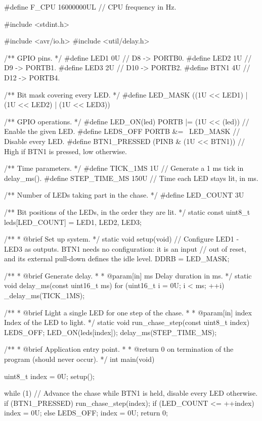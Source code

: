 \begin{ccode}
#define F_CPU 16000000UL // CPU frequency in Hz.

#include <stdint.h>

#include <avr/io.h>
#include <util/delay.h>

/** GPIO pins. */
#define LED1 0U // D8  -> PORTB0.
#define LED2 1U // D9  -> PORTB1.
#define LED3 2U // D10 -> PORTB2.
#define BTN1 4U // D12 -> PORTB4.

/** Bit mask covering every LED. */
#define LED_MASK ((1U << LED1) | (1U << LED2) | (1U << LED3))

/** GPIO operations. */
#define LED_ON(led) PORTB |= (1U << (led))  // Enable the given LED.
#define LEDS_OFF PORTB &= ~LED_MASK         // Disable every LED.
#define BTN1_PRESSED (PINB & (1U << BTN1))  // High if BTN1 is pressed, low otherwise.

/** Time parameters. */
#define TICK_1MS 1U       // Generate a 1 ms tick in delay_ms().
#define STEP_TIME_MS 150U // Time each LED stays lit, in ms.

/** Number of LEDs taking part in the chase. */
#define LED_COUNT 3U

/** Bit positions of the LEDs, in the order they are lit. */
static const uint8_t leds[LED_COUNT] = {LED1, LED2, LED3};

/**
 * @brief Set up system.
 */
static void setup(void)
{
    // Configure LED1 - LED3 as outputs. BTN1 needs no configuration: it is an input
    // out of reset, and its external pull-down defines the idle level.
    DDRB = LED_MASK;
}

/**
 * @brief Generate delay.
 *
 * @param[in] ms Delay duration in ms.
 */
static void delay_ms(const uint16_t ms)
{
    for (uint16_t i = 0U; i < ms; ++i)
    {
        _delay_ms(TICK_1MS);
    }
}

/**
 * @brief Light a single LED for one step of the chase.
 *
 * @param[in] index Index of the LED to light.
 */
static void run_chase_step(const uint8_t index)
{
    LEDS_OFF;
    LED_ON(leds[index]);
    delay_ms(STEP_TIME_MS);
}

/**
 * @brief Application entry point.
 *
 * @return 0 on termination of the program (should never occur).
 */
int main(void)
{
    uint8_t index = 0U;
    setup();

    while (1)
    {
        // Advance the chase while BTN1 is held, disable every LED otherwise.
        if (BTN1_PRESSED)
        {
            run_chase_step(index);
            if (LED_COUNT <= ++index) { index = 0U; }
        }
        else
        {
            LEDS_OFF;
            index = 0U;
        }
    }
    return 0;
}
\end{ccode}

